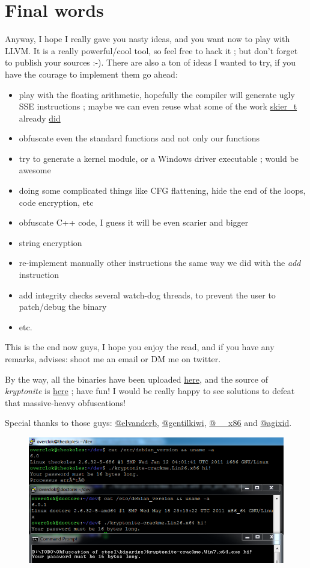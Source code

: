 \documentclass[a4paper, 11pt, notitlepage]{report}
\begin{document}
\section{Final words}
Anyway, I hope I really gave you nasty ideas, and you want now to play with LLVM. It is a really powerful/cool tool, so feel free to hack it ; but don't forget to publish your sources :-).
There are also a ton of ideas I wanted to try, if you have the courage to implement them go ahead:
\begin{itemize}
	\item play with the floating arithmetic, hopefully the compiler will generate ugly SSE instructions ; maybe we can even reuse what some of the work \href{https://twitter.com/skier_t}{skier\_t} already \href{https://github.com/jbremer/ssexy}{did}
	\item obfuscate even the standard functions and not only our functions
	\item try to generate a kernel module, or a Windows driver executable ; would be awesome
	\item doing some complicated things like CFG flattening, hide the end of the loops, code encryption, etc
	\item obfuscate C++ code, I guess it will be even scarier and bigger
	\item string encryption
	\item re-implement manually other instructions the same way we did with the \textit{add} instruction
	\item add integrity checks several watch-dog threads, to prevent the user to patch/debug the binary
	\item etc.
\end{itemize}
This is the end now guys, I hope you enjoy the read, and if you have any remarks, advises: shoot me an email or DM me on twitter.

By the way, all the binaries have been uploaded \href{http://download.tuxfamily.org/overclokblog/Obfuscation%20of%20steel%3a%20meet%20my%20Kryptonite/binaries/}{here}, and the source of \textit{kryptonite} is \href{https://github.com/0vercl0k/stuffz/blob/master/llvm-funz/kryptonite/llvm-functionpass-kryptonite-obfuscater.cpp}{here} ; have fun! I would be really happy to see solutions to defeat that massive-heavy obfuscations!

Special thanks to those guys: \href{https://twitter.com/elvanderb}{@elvanderb}, \href{https://twitter.com/gentilkiwi}{@gentilkiwi}, \href{https://twitter.com/__x86}{@\_\_x86} and \href{https://twitter.com/agixid}{@agixid}.

\begin{figure}[H]
  \centering
  \includegraphics[scale=0.7]{pics/crackme.png}
\end{figure}
\end{document}
